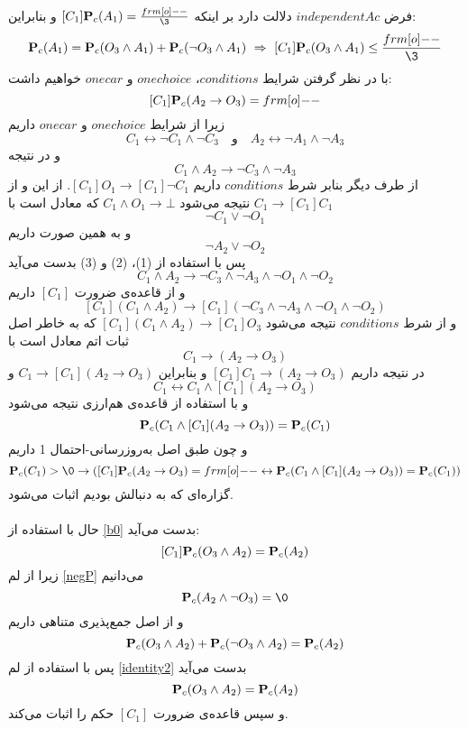 فرض $independentAc$ دلالت دارد بر اینکه $ [C_1]\mbP_c(A_1)=\frac{\1}{\3} $ و بنابراین:
\begin{equation}\label{a}
\mbP_c(A_1)=\mbP_c(O_3\wedge A_1)+\mbP_c(\neg O_3\wedge A_1)\ \Rightarrow\ [C_1]\mbP_c(O_3\wedge A_1)\leq\frac{\1}{\3}
\end{equation}
با در نظر گرفتن شرایط $conditions$،  $onechoice$ و $onecar$ خواهیم داشت:
\begin{equation}\label{b0}
 [C_1]\mbP_c(A_2\rightarrow O_3)=\1
\end{equation}
زیرا از شرایط $onechoice$ و $onecar$ داریم
$$C_1\leftrightarrow\neg C_1\wedge\neg C_3\quad\textrm{و}\quad A_2\leftrightarrow\neg A_1\wedge\neg A_3$$
و در نتیجه 
\begin{equation}\tag{1}
C_1\wedge A_2\rightarrow \neg C_3\wedge\neg A_3
\end{equation}
از طرف دیگر بنابر شرط $ conditions $ داریم $ [C_1]O_1\rightarrow[C_1]\neg C_1 $. از این و از $ C_1\rightarrow[C_1]C_1 $ نتیجه می‌شود $ C_1\wedge O_1\rightarrow\bot $ که معادل است با
\begin{equation}\tag{2}
\neg C_1\vee \neg O_1
\end{equation}
و به همین صورت داریم
\begin{equation}\tag{3}
\neg A_2\vee \neg O_2
\end{equation}
پس با استفاده از (1)، (2) و (3) بدست می‌آید
$$C_1\wedge A_2\rightarrow \neg C_3\wedge\neg A_3\wedge\neg O_1\wedge\neg O_2$$
و از قاعده‌ی ضرورت $ [C_1] $ داریم
$$[C_1](C_1\wedge A_2)\rightarrow [C_1](\neg C_3\wedge\neg A_3\wedge\neg O_1\wedge\neg O_2)$$
و از شرط $ conditions $ نتیجه می‌شود $ [C_1](C_1\wedge A_2)\rightarrow [C_1]O_3 $ که به خاطر اصل ثبات اتم معادل است با
$$C_1\rightarrow(A_2\rightarrow O_3)$$
در نتیجه داریم $ [C_1]C_1\rightarrow(A_2\rightarrow O_3) $ و بنابراین $ C_1\rightarrow[C_1](A_2\rightarrow O_3) $ و
$$C_1\leftrightarrow C_1\wedge[C_1](A_2\rightarrow O_3)$$
و با استفاده از قاعده‌ی هم‌ارزی نتیجه می‌شود
$$\mathbf{P}_c(C_1\wedge[C_1](A_2\rightarrow O_3))=\mathbf{P}_c(C_1)$$
و چون طبق اصل به‌روزرسانی-احتمال 1 داریم
$$\mbP_c(C_1)>\0\rightarrow([C_1]\mbP_c(A_2\rightarrow O_3)=\1\leftrightarrow \mbP_c(C_1\wedge[C_1](A_2\rightarrow O_3))=\mbP_c(C_1))$$
گزاره‌ای که به دنبالش بودیم اثبات می‌شود.
\\ \\
حال با استفاده از \ref{b0} بدست می‌آید:
\begin{equation}\label{b}
 [C_1]\mathbf{P}_c(O_3\wedge A_2)=\mathbf{P}_c(A_2) 
\end{equation}
زیرا از لم \ref{negP} می‌دانیم
$$ \mbP_c(A_2\wedge\neg O_3)=\0 $$
و از اصل جمع‌پذیری متناهی داریم
$$ \mathbf{P}_c(O_3\wedge A_2)+\mathbf{P}_c(\neg O_3\wedge A_2)=\mathbf{P}_c(A_2) $$
پس با استفاده از لم \ref{identity2} بدست می‌آید
$$ \mathbf{P}_c(O_3\wedge A_2)=\mathbf{P}_c(A_2) $$
و سپس قاعده‌ی ضرورت $ [C_1] $ حکم را اثبات می‌کند.

